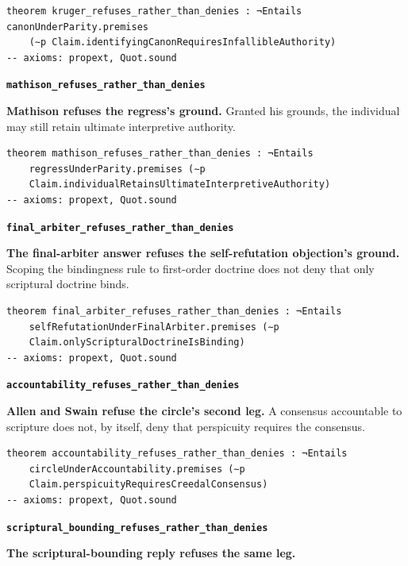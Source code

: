 \documentclass[11pt]{article}
\begin{document}
{\small\begin{verbatim}
theorem kruger_refuses_rather_than_denies : ¬Entails canonUnderParity.premises
    (∼p Claim.identifyingCanonRequiresInfallibleAuthority)
-- axioms: propext, Quot.sound
\end{verbatim}}
\par\medskip\noindent\textbf{\texttt{mathison\_\allowbreak{}refuses\_\allowbreak{}rather\_\allowbreak{}than\_\allowbreak{}denies}}\par\nobreak\noindent
\textbf{Mathison refuses the regress's ground.} Granted his grounds, the individual may still retain ultimate interpretive authority.

{\small\begin{verbatim}
theorem mathison_refuses_rather_than_denies : ¬Entails
    regressUnderParity.premises (∼p
    Claim.individualRetainsUltimateInterpretiveAuthority)
-- axioms: propext, Quot.sound
\end{verbatim}}
\par\medskip\noindent\textbf{\texttt{final\_\allowbreak{}arbiter\_\allowbreak{}refuses\_\allowbreak{}rather\_\allowbreak{}than\_\allowbreak{}denies}}\par\nobreak\noindent
\textbf{The final-arbiter answer refuses the self-refutation objection's ground.} Scoping the bindingness rule to first-order doctrine does not deny that only scriptural doctrine binds.

{\small\begin{verbatim}
theorem final_arbiter_refuses_rather_than_denies : ¬Entails
    selfRefutationUnderFinalArbiter.premises (∼p
    Claim.onlyScripturalDoctrineIsBinding)
-- axioms: propext, Quot.sound
\end{verbatim}}
\par\medskip\noindent\textbf{\texttt{accountability\_\allowbreak{}refuses\_\allowbreak{}rather\_\allowbreak{}than\_\allowbreak{}denies}}\par\nobreak\noindent
\textbf{Allen and Swain refuse the circle's second leg.} A consensus accountable to scripture does not, by itself, deny that perspicuity requires the consensus.

{\small\begin{verbatim}
theorem accountability_refuses_rather_than_denies : ¬Entails
    circleUnderAccountability.premises (∼p
    Claim.perspicuityRequiresCreedalConsensus)
-- axioms: propext, Quot.sound
\end{verbatim}}
\par\medskip\noindent\textbf{\texttt{scriptural\_\allowbreak{}bounding\_\allowbreak{}refuses\_\allowbreak{}rather\_\allowbreak{}than\_\allowbreak{}denies}}\par\nobreak\noindent
\textbf{The scriptural-bounding reply refuses the same leg.}
\end{document}
